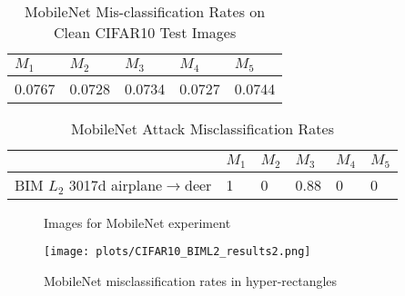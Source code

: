 \documentclass[12pt]{article}
\begin{document}
%
\begin{table}[t]
\centering
\caption{MobileNet Mis-classification Rates on Clean CIFAR10 Test Images}
\label{tab:MobileNet-baseline}
\begin{center}
  {\footnotesize
\begin{tabular}{|lllll|}
\hline
$M_1$ & $M_2$ & $M_3$ & $M_4$ & $M_5$ \\\hline 
0.0767 & 0.0728 & 0.0734 & 0.0727 &  0.0744 \\
\hline 
\end{tabular} }
\end{center}
\end{table}

%
\begin{table}[t]
\caption{MobileNet Attack Misclassification Rates}
\label{tab:attack-misrate-MobileNet}
\begin{center}
{\footnotesize
\begin{tabular}{|l|lllll|} \hline
  &$M_1$&$M_2$&$M_3$&$M_4$&$M_5$\\\hline
BIM $L_2$ 3017d airplane$\to$deer & 1 & 0 & 0.88 & 0 & 0\\
\hline
\end{tabular} }
\end{center}
\end{table}

%
\begin{figure}[t]
\centering
{}
\centering
{}
\centering
{}
\caption{Images for MobileNet experiment}
\label{fig:MobileNet-images}
\end{figure}

%
\begin{figure}[t]
\centering
\centering
\texttt{[image: plots/CIFAR10\_BIML2\_results2.png]}
\caption{MobileNet misclassification rates in hyper-rectangles}
\label{fig:MobileNet-plotresults}
\end{figure}


%
\end{document}
